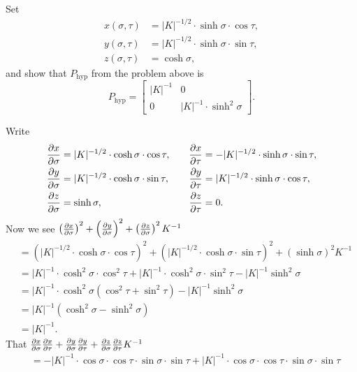 \documentclass[newpage,hints,handout]{ximera}
\begin{document}
\begin{problem}
  Set
  \begin{align*}
    x(\sigma,\tau) &=|K|^{-1/2}\cdot \sinh\sigma\cdot \cos \tau,\\
    y(\sigma,\tau) &=|K|^{-1/2}\cdot \sinh\sigma\cdot \sin\tau,\\
    z(\sigma,\tau) &=\cosh\sigma,
  \end{align*}
  and show that $P_\mathrm{hyp}$ from the problem above is
  \[
  P_\mathrm{hyp} =
  \begin{bmatrix}
    |K|^{-1} & 0 \\
    0 &  |K|^{-1}\cdot\sinh^2 \sigma
  \end{bmatrix}.
  \]
  \begin{freeResponse}
    Write
    \[
    \begin{split}
      \pp[x]{\sigma} &= |K|^{-1/2}\cdot \cosh\sigma\cdot \cos \tau, \\
      \pp[y]{\sigma} &= |K|^{-1/2}\cdot \cosh\sigma\cdot \sin\tau,\\
      \pp[z]{\sigma} &= \sinh\sigma,
    \end{split}
    \qquad
    \begin{split}
      \pp[x]{\tau} &= -|K|^{-1/2}\cdot \sinh\sigma\cdot \sin \tau,\\
      \pp[y]{\tau} &= |K|^{-1/2}\cdot \sinh\sigma\cdot \cos\tau,\\
      \pp[z]{\tau} &= 0. 
    \end{split}
    \]
    Now we see $\left(\pp[x]{\sigma}\right)^2 + \left(\pp[y]{\sigma}\right)^2 + \left(\pp[z]{\sigma}\right)^2K^{-1}$
    \begin{align*}
      &= \left(|K|^{-1/2}\cdot \cosh\sigma\cdot \cos \tau \right)^2 + \left(|K|^{-1/2}\cdot \cosh\sigma\cdot \sin\tau\right)^2 + \left(\sinh\sigma\right)^2K^{-1}\\
      &= |K|^{-1}\cdot \cosh^2\sigma\cdot \cos^2 \tau + |K|^{-1}\cdot \cosh^2\sigma\cdot \sin^2\tau - |K|^{-1} \sinh^2\sigma \\
      &= |K|^{-1}\cdot \cosh^2\sigma\left(\cos^2 \tau + \sin^2\tau\right) -|K|^{-1} \sinh^2\sigma \\
      &= |K|^{-1}\left(\cosh^2\sigma -\sinh^2\sigma\right) \\
      &= |K|^{-1}.
    \end{align*}
    That $\pp[x]{\sigma}\pp[x]{\tau} + \pp[y]{\sigma}\pp[y]{\tau} + \pp[z]{\sigma}\pp[z]{\tau} K^{-1}$
    \begin{align*}
      &= -|K|^{-1}\cdot \cos\sigma\cdot \cos \tau \cdot \sin\sigma\cdot \sin \tau + |K|^{-1}\cdot \cos\sigma\cdot \cos \tau \cdot \sin\sigma\cdot \sin \tau\\

\end{align*}
\end{freeResponse}
\end{problem}
\end{document}
